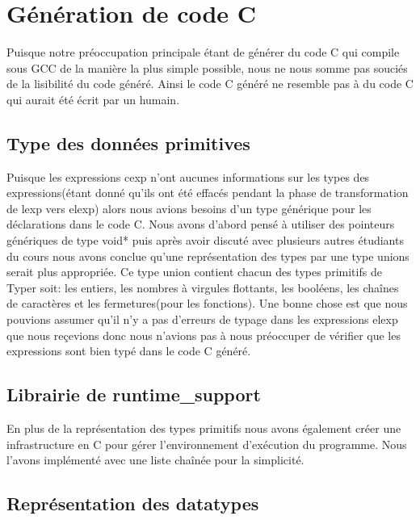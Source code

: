\documentclass{article}
\begin{document}
\section{Génération de code C}
Puisque notre préoccupation principale étant de générer du code C qui compile
sous GCC de la manière la plus simple possible, nous ne nous somme pas souciés
de la lisibilité du code généré. Ainsi le code C généré ne resemble pas à du
code C qui aurait été écrit par un humain.

\subsection{Type des données primitives}
Puisque les expressions cexp n'ont aucunes informations sur les types des 
expressions(étant donné qu'ils ont été effacés pendant la phase de 
transformation de lexp vers elexp) alors nous avions besoins d'un type
générique pour les déclarations dans le code C. Nous avons d'abord pensé à
utiliser des pointeurs génériques de type void* puis après avoir discuté avec
plusieurs autres étudiants du cours nous avons conclue qu'une représentation
des types par une type unions serait plus appropriée. Ce type union contient
chacun des types primitifs de Typer soit: les entiers, les nombres à virgules
flottants, les booléens, les chaînes de caractères et les fermetures(pour les
fonctions). Une bonne chose est que nous pouvions assumer qu'il n'y a pas
d'erreurs de typage dans les expressions elexp que nous reçevions donc nous
n'avions pas à nous préoccuper de vérifier que les expressions sont bien
typé dans le code C généré.

\subsection{Librairie de runtime\_support}
En plus de la représentation des types primitifs nous avons également créer
une infrastructure en C pour gérer l'environnement d'exécution du programme.
Nous l'avons implémenté avec une liste chaînée pour la simplicité.

\subsection{Représentation des datatypes}
\end{document}
